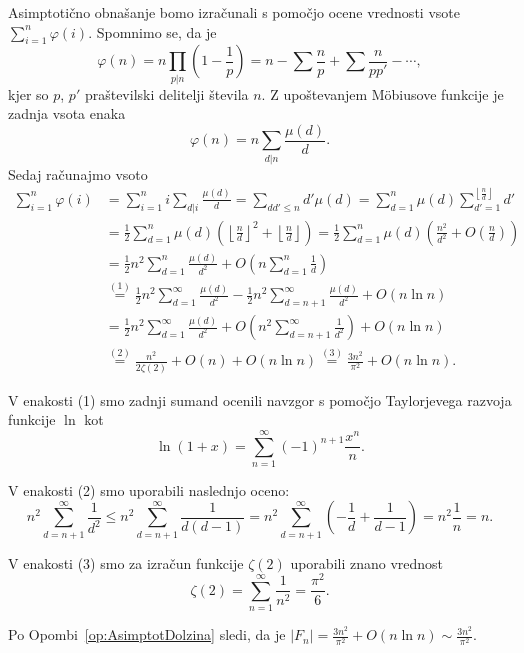 \documentclass[mat1]{fmfdelo}
\begin{document}
\begin{dokaz}
Asimptotično obnašanje bomo izračunali s pomočjo ocene vrednosti vsote \( \sum_{i=1}^n \varphi(i) \).
Spomnimo se, da je \[ \varphi(n) = n \prod_{p|n} \left (1 - \frac{1}{p} \right ) = n - \sum \frac{n}{p} + \sum \frac{n}{pp'} - \cdots , \]
kjer so $p$, $p'$ praštevilski delitelji števila $n$.  Z upoštevanjem M\"obiusove funkcije je zadnja vsota enaka
\[ \varphi(n) = n \sum_{d|n} \frac{\mu(d)}{d} .\]
Sedaj računajmo vsoto 
%
\begin{align*}
\sum_{i=1}^n \varphi(i)
  &= \sum_{i=1}^n i \sum_{d|i} \frac{\mu(d)}{d} = \sum_{dd'\leq n}d' \mu(d) = 
    \sum_{d=1}^n \mu(d) \sum_{d'=1}^{\left \lfloor \frac{n}{d} \right \rfloor} d' \\
  &= \frac{1}{2} \sum_{d=1}^{n} \mu(d) \left (\left \lfloor \frac{n}{d} \right \rfloor ^2 + \left \lfloor \frac{n}{d} \right \rfloor \right) =
    \frac{1}{2} \sum_{d=1}^{n} \mu(d) \left (\frac{n^2}{d^2} + O \left (\frac{n}{d} \right) \right) \\
  &= \frac{1}{2}n^2 \sum_{d=1}^{n} \frac{\mu(d)}{d^2} + O \left (n \sum_{d=1}^{n} \frac{1}{d} \right ) \\
  &\stackrel{(1)}{=} \frac{1}{2}n^2 \sum_{d=1}^{\infty} \frac{\mu(d)}{d^2} - \frac{1}{2}n^2 \sum_{d=n+1}^{\infty} \frac{\mu(d)}{d^2} + O(n \ln{n}) \\
  &= \frac{1}{2}n^2 \sum_{d=1}^{\infty} \frac{\mu(d)}{d^2} + O \left (n^2\sum_{d=n+1}^{\infty} \frac{1}{d^2} \right ) + O(n \ln{n}) \\
  & \stackrel{(2)}{=} \frac{n^2}{2 \zeta(2)} + O(n) + O(n \ln{n}) \stackrel{(3)}{=} \frac{3n^2}{\pi^2} + O(n \ln{n}).
\end{align*}

V enakosti (1) smo zadnji sumand ocenili navzgor s pomočjo Taylorjevega razvoja funkcije $\ln$ kot
\[ \ln{(1+x)} = \sum_{n=1}^{\infty} (-1)^{n+1} \frac{x^n}{n}.\]

V enakosti (2) smo uporabili naslednjo oceno:
\[ n^2 \sum_{d=n+1}^{\infty} \frac{1}{d^2} \leq n^2 \sum_{d=n+1}^{\infty} \frac{1}{d(d-1)} = 
n^2 \sum_{d=n+1}^{\infty} \left (- \frac{1}{d} + \frac{1}{d-1} \right ) = n^2 \frac{1}{n} = n.\]

V enakosti (3) smo za izračun funkcije $\zeta(2)$ uporabili znano vrednost
\[ \zeta(2) = \sum_{n=1}^{\infty} \frac{1}{n^2} = \frac{\pi^2}{6}.\]

Po Opombi~\ref{op:AsimptotDolzina} sledi, da je \(|F_n| = \frac{3n^2}{\pi^2} + O(n \ln{n}) \sim\frac{3n^2}{\pi^2}. \)
\end{dokaz}
\end{document}
